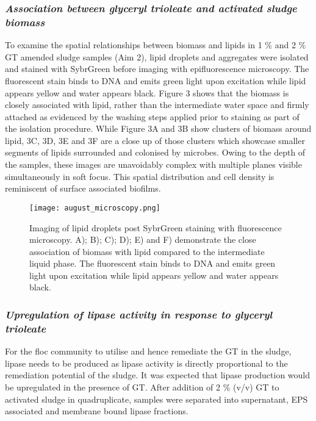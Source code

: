 \documentclass[twoside]{article}
\begin{document}
\subsubsection{\emph{Association between glyceryl trioleate and activated sludge biomass}}
To examine the spatial relationships between biomass and lipids in 1 \% and 2 \% GT amended sludge samples (Aim 2), lipid droplets and aggregates were isolated and stained with SybrGreen before imaging with epifluorescence microscopy. The fluorescent stain binds to DNA and emits green light upon excitation while lipid appears yellow and water appears black. Figure 3 shows that the biomass is closely associated with lipid, rather than the intermediate water space and firmly attached as evidenced by the washing steps applied prior to staining as part of the isolation procedure. While Figure 3A and 3B show clusters of biomass around lipid, 3C, 3D, 3E and 3F are a close up of those clusters which showcase smaller segments of lipids surrounded and colonised by microbes. Owing to the depth of the samples, these images are unavoidably complex with multiple planes visible simultaneously in soft focus. This spatial distribution and cell density is reminiscent of surface associated biofilms.
\begin{figure}
\texttt{[image: august\_microscopy.png]}
\caption{Imaging of lipid droplets post SybrGreen staining with fluorescence microscopy. A); B); C); D); E) and F) demonstrate the close association of biomass with lipid compared to the intermediate liquid phase.
The fluorescent stain binds to DNA and emits green light upon excitation while lipid appears yellow and water appears black.}
\end{figure}

\FloatBarrier
\subsubsection{\emph{Upregulation of lipase activity in response to glyceryl trioleate}}
For the floc community to utilise and hence remediate the GT in the sludge, lipase needs to be produced as lipase activity is directly proportional to the remediation potential of the sludge. It was expected that lipase production would be upregulated in the presence of GT.
After addition of 2 \% (v/v) GT to activated sludge in quadruplicate, samples were separated into supernatant, EPS associated and membrane bound lipase fractions. \\
\end{document}
